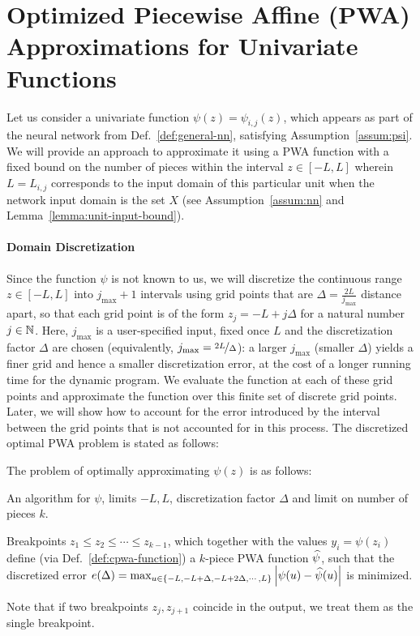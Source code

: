 \section{Optimized Piecewise Affine (PWA) Approximations for Univariate Functions}\label{sec:optimal-pwa-univariate-fun}

Let us consider a univariate function $\psi(z) = \psi_{i,j}(z)$, which appears as part of the neural network from Def.~\ref{def:general-nn},  satisfying Assumption~\ref{assum:psi}. We will provide an approach to approximate it using a PWA function with a fixed bound on the number of pieces within the interval $z \in [-L, L]$ wherein $L=L_{i,j}$ corresponds to the input domain of this particular unit when the network input domain is the set $X$ (see Assumption~\ref{assum:nn} and Lemma~\ref{lemma:unit-input-bound}).

\paragraph{Domain Discretization} Since the function $\psi$ is not known to us, we will discretize the continuous range $z \in [-L,L]$ into $j_{\max} +1$ intervals using grid points that are $\Delta = \frac{2L}{j_{\max}}$ distance apart, so that each grid point is of the form  $z_j = -L + j \Delta$ for a natural number $j \in \mathbb{N}$. Here, $j_{\max}$ is a user-specified input, fixed once $L$ and the discretization factor $\Delta$ are chosen (equivalently, $j_{\max} = \nicefrac{2L}{\Delta}$): a larger $j_{\max}$ (smaller $\Delta$) yields a finer grid and hence a smaller discretization error, at the cost of a longer running time for the dynamic program. We evaluate the function at each of these grid points and approximate the function over this finite set of discrete grid points. Later, we will show how to account for the error introduced by the interval between the grid points that is not accounted for in this process. 
The discretized optimal PWA problem is stated as follows:

\begin{problem}\label{prob:univariate-pwa}
The problem of optimally approximating  $\psi(z)$ is as follows:
\begin{compactdesc}
\item[Inputs:] An algorithm for $\psi$, limits $-L, L$, discretization factor $\Delta$ and limit on number of pieces $k$.
\item[Output:] Breakpoints $z_1 \leq z_2 \leq \cdots \leq z_{k-1}$, which together with the values $y_i = \psi(z_i)$ define (via Def.~\ref{def:cpwa-function}) a $k$-piece PWA function $\widehat{\psi}$, such that the discretized error $e(\Delta) = \max_{u \in \{ -L, -L + \Delta, -L + 2 \Delta, \cdots, L\}} \left| \psi(u) - \widehat{\psi}(u) \right| $ is minimized.
\end{compactdesc}
Note that if two breakpoints $z_j, z_{j+1}$ coincide in the output, we treat them as the single breakpoint.
\end{problem}

